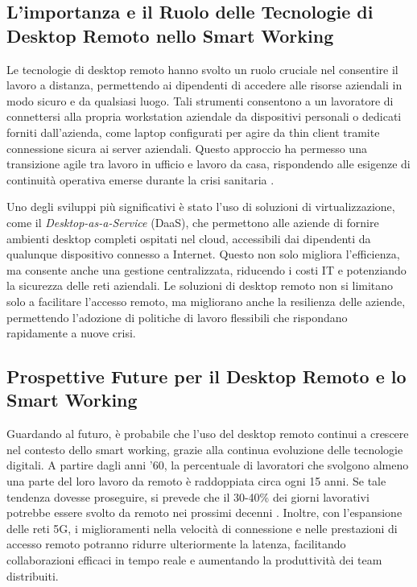 \documentclass[12pt,a4paper,openright,twoside]{book}
\begin{document}
\subsection{L’importanza e il Ruolo delle Tecnologie di Desktop Remoto nello Smart Working}
Le tecnologie di desktop remoto hanno svolto un ruolo cruciale nel consentire il lavoro a distanza, permettendo ai dipendenti di accedere alle risorse aziendali in modo sicuro e da qualsiasi luogo. Tali strumenti consentono a un lavoratore di connettersi alla propria workstation aziendale da dispositivi personali o dedicati forniti dall’azienda, come laptop configurati per agire da thin client tramite connessione sicura ai server aziendali. Questo approccio ha permesso una transizione agile tra lavoro in ufficio e lavoro da casa, rispondendo alle esigenze di continuità operativa emerse durante la crisi sanitaria \cite{urbaniec2022, Barrero2023}.

Uno degli sviluppi più significativi è stato l’uso di soluzioni di virtualizzazione, come il \emph{Desktop-as-a-Service} (DaaS), che permettono alle aziende di fornire ambienti desktop completi ospitati nel cloud, accessibili dai dipendenti da qualunque dispositivo connesso a Internet. Questo non solo migliora l'efficienza, ma consente anche una gestione centralizzata, riducendo i costi IT e potenziando la sicurezza delle reti aziendali. Le soluzioni di desktop remoto non si limitano solo a facilitare l’accesso remoto, ma migliorano anche la resilienza delle aziende, permettendo l’adozione di politiche di lavoro flessibili che rispondano rapidamente a nuove crisi.

\subsection{Prospettive Future per il Desktop Remoto e lo Smart Working}
Guardando al futuro, è probabile che l'uso del desktop remoto continui a crescere nel contesto dello smart working, grazie alla continua evoluzione delle tecnologie digitali. A partire dagli anni '60, la percentuale di lavoratori che svolgono almeno una parte del loro lavoro da remoto è raddoppiata circa ogni 15 anni. Se tale tendenza dovesse proseguire, si prevede che il 30-40\% dei giorni lavorativi potrebbe essere svolto da remoto nei prossimi decenni \cite{Barrero2023}. Inoltre, con l’espansione delle reti 5G, i miglioramenti nella velocità di connessione e nelle prestazioni di accesso remoto potranno ridurre ulteriormente la latenza, facilitando collaborazioni efficaci in tempo reale e aumentando la produttività dei team distribuiti.
\end{document}
